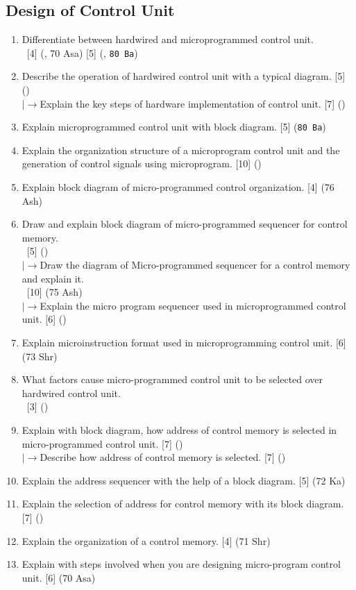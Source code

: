 \documentclass[12pt]{article}
\newcommand{\lb}{\\$\left|\rightarrow\right.$}
\newcommand{\enter}{\\\textcolor{white}{1}}
\begin{document}
	\subsection{Design of Control Unit}
		\begin{enumerate}[noitemsep, topsep=0pt]
			\item Differentiate between hardwired and microprogrammed control unit. 
			\enter\hfill [4] (, 70 Asa) [5] (, \texttt{80 Ba})
			
			\item Describe the operation of hardwired control unit with a typical diagram. \hfill [5] ()
			\lb Explain the key steps of hardware implementation of control unit. \hfill [7] ()
			
			\item Explain microprogrammed control unit with block diagram. \hfill [5] (\texttt{80 Ba})
			
			\item Explain the organization structure of a microprogram control unit and the generation of control signals using microprogram. \hfill [10] ()
			
			\item Explain block diagram of micro-programmed control organization. \hfill [4] (76 Ash)
			
			\item Draw and explain block diagram of micro-programmed sequencer for control memory.
			\enter\hfill [5] ()	
			\lb Draw the diagram of Micro-programmed sequencer for a control memory and explain it. 
			\enter\hfill [10] (75 Ash)
			\lb Explain the micro program sequencer used in microprogrammed control unit. \hfill [6] ()
			
			\item Explain microinstruction format used in microprogramming control unit. \hfill [6] (73 Shr)
			
			\item What factors cause micro-programmed control unit to be selected over hardwired control unit.
			\enter\hfill [3] ()
			
			\item Explain with block diagram, how address of control memory is selected in micro-programmed control unit. \hfill [7] ()
			\lb Describe how address of control memory is selected. \hfill [7] ()
			
			\item Explain the address sequencer with the help of a block diagram. \hfill [5] (72 Ka)
			
			\item Explain the selection of address for control memory with its block diagram. \hfill [7] ()
			
			\item Explain the organization of a control memory. \hfill [4] (71 Shr)
			
			\item Explain with steps involved when you are designing micro-program control unit. \hfill [6] (70 Asa)
		\end{enumerate}
\end{document}

